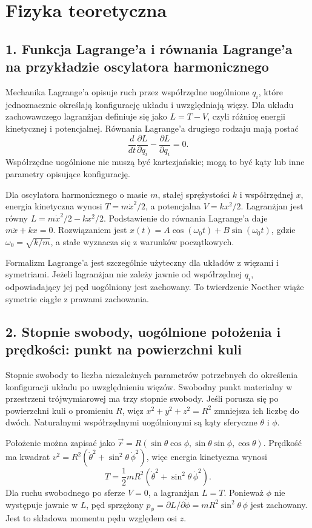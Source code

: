 \documentclass[11pt,a4paper,oneside]{report}
\begin{document}
\chapter{Fizyka teoretyczna}
\section{1. Funkcja Lagrange’a i równania Lagrange’a na przykładzie oscylatora harmonicznego}
Mechanika Lagrange’a opisuje ruch przez współrzędne uogólnione \(q_i\), które jednoznacznie określają konfigurację układu i uwzględniają więzy. Dla układu zachowawczego lagranżjan definiuje się jako \(L=T-V\), czyli różnicę energii kinetycznej i potencjalnej. Równania Lagrange’a drugiego rodzaju mają postać
\[
\frac{d}{dt}\frac{\partial L}{\partial\dot q_i}-\frac{\partial L}{\partial q_i}=0.
\]
Współrzędne uogólnione nie muszą być kartezjańskie; mogą to być kąty lub inne parametry opisujące konfigurację.

Dla oscylatora harmonicznego o masie \(m\), stałej sprężystości \(k\) i współrzędnej \(x\), energia kinetyczna wynosi \(T=m\dot x^2/2\), a potencjalna \(V=kx^2/2\). Lagranżjan jest równy \(L=m\dot x^2/2-kx^2/2\). Podstawienie do równania Lagrange’a daje \(m\ddot x+kx=0\). Rozwiązaniem jest \(x(t)=A\cos(\omega_0t)+B\sin(\omega_0t)\), gdzie \(\omega_0=\sqrt{k/m}\), a stałe wyznacza się z warunków początkowych.

Formalizm Lagrange’a jest szczególnie użyteczny dla układów z więzami i symetriami. Jeżeli lagranżjan nie zależy jawnie od współrzędnej \(q_i\), odpowiadający jej pęd uogólniony jest zachowany. To twierdzenie Noether wiąże symetrie ciągłe z prawami zachowania.

\section{2. Stopnie swobody, uogólnione położenia i prędkości: punkt na powierzchni kuli}
Stopnie swobody to liczba niezależnych parametrów potrzebnych do określenia konfiguracji układu po uwzględnieniu więzów. Swobodny punkt materialny w przestrzeni trójwymiarowej ma trzy stopnie swobody. Jeśli porusza się po powierzchni kuli o promieniu \(R\), więz \(x^2+y^2+z^2=R^2\) zmniejsza ich liczbę do dwóch. Naturalnymi współrzędnymi uogólnionymi są kąty sferyczne \(\theta\) i \(\phi\).

Położenie można zapisać jako \(\vec r=R(\sin\theta\cos\phi,\sin\theta\sin\phi,\cos\theta)\). Prędkość ma kwadrat \(v^2=R^2(\dot\theta^2+\sin^2\theta\,\dot\phi^2)\), więc energia kinetyczna wynosi
\[
T=\frac12mR^2(\dot\theta^2+\sin^2\theta\,\dot\phi^2).
\]
Dla ruchu swobodnego po sferze \(V=0\), a lagranżjan \(L=T\). Ponieważ \(\phi\) nie występuje jawnie w \(L\), pęd sprzężony \(p_\phi=\partial L/\partial\dot\phi=mR^2\sin^2\theta\,\dot\phi\) jest zachowany. Jest to składowa momentu pędu względem osi \(z\).
\end{document}
